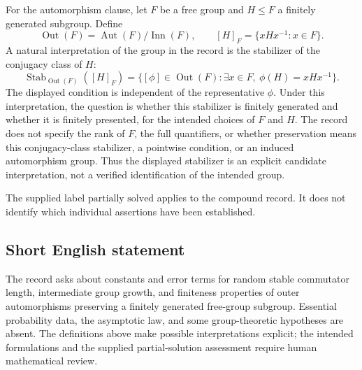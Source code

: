 \documentclass[11pt]{article}
\begin{document}
For the automorphism clause, let \(F\) be a free group and \(H\leq F\) a finitely generated subgroup. Define
\[
\operatorname{Out}(F)=\operatorname{Aut}(F)/\operatorname{Inn}(F),
\qquad
[H]_F=\{xHx^{-1}:x\in F\}.
\]
A natural interpretation of the group in the record is the stabilizer of the conjugacy class of \(H\):
\[
\operatorname{Stab}_{\operatorname{Out}(F)}([H]_F)
=\{[\phi]\in\operatorname{Out}(F):\exists x\in F,\ \phi(H)=xHx^{-1}\}.
\]
The displayed condition is independent of the representative \(\phi\). Under this interpretation, the question is whether this stabilizer is finitely generated and whether it is finitely presented, for the intended choices of \(F\) and \(H\). The record does not specify the rank of \(F\), the full quantifiers, or whether preservation means this conjugacy-class stabilizer, a pointwise condition, or an induced automorphism group. Thus the displayed stabilizer is an explicit candidate interpretation, not a verified identification of the intended group.

The supplied label \(\text{partially solved}\) applies to the compound record. It does not identify which individual assertions have been established.
\subsection{Short English statement}
The record asks about constants and error terms for random stable commutator length, intermediate group growth, and finiteness properties of outer automorphisms preserving a finitely generated free-group subgroup. Essential probability data, the asymptotic law, and some group-theoretic hypotheses are absent. The definitions above make possible interpretations explicit; the intended formulations and the supplied partial-solution assessment require human mathematical review.
\end{document}
